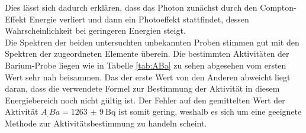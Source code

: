 Dies lässt sich dadurch erklären, dass das Photon zunächst durch den Compton-Effekt Energie verliert und dann ein Photoeffekt stattfindet, dessen Wahrscheinlichkeit bei geringeren Energien steigt.\\
Die Spektren der beiden untersuchten unbekannten Proben stimmen gut mit den Spektren der zugeordneten Elemente überein. 
Die bestimmten Aktivitäten der Barium-Probe liegen wie in Tabelle \ref{tab:ABa} zu sehen abgesehen vom ersten Wert sehr nah beisammen. Das der erste Wert von den Anderen abweicht liegt daran, dass die verwendete Formel zur Bestimmung der Aktivität in diesem Energiebereich noch nicht gültig ist. Der Fehler auf den gemittelten Wert der Aktivität $A_.{Ba}=\SI{1263(9)}{\becquerel}$ ist somit gering, weshalb es sich um eine geeignete Methode zur Aktivitätsbestimmung zu handeln scheint. 
